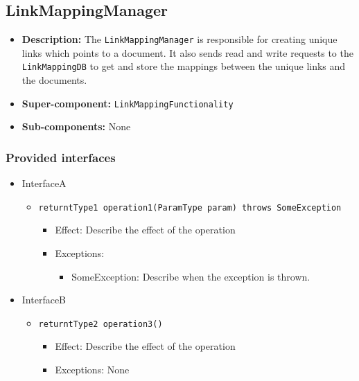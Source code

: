\documentclass[a4paper,10pt]{article}
\begin{document}
\subsection{LinkMappingManager}
\begin{itemize}
    \item \textbf{Description:} The \texttt{LinkMappingManager} is responsible for creating unique links which points to a document. It also sends read and write requests to the \texttt{LinkMappingDB} to get and store the mappings between the unique links and the documents.
    \item \textbf{Super-component:} \texttt{LinkMappingFunctionality}
    \item \textbf{Sub-components:} None
\end{itemize}

\subsubsection*{Provided interfaces}
\begin{itemize}
    \item InterfaceA
    \begin{itemize}
        \item \texttt{returntType1 operation1(ParamType param) throws SomeException}
        \begin{itemize}
            \item Effect: Describe the effect of the operation
            \item Exceptions:
            \begin{itemize}
                \item SomeException: Describe when the exception is thrown.
            \end{itemize}
        \end{itemize}
    \end{itemize}

    \item InterfaceB
    \begin{itemize}
        \item \texttt{returntType2 operation3()}
        \begin{itemize}
            \item Effect: Describe the effect of the operation
            \item Exceptions: None
        \end{itemize}
    \end{itemize}
\end{itemize}
\end{document}
